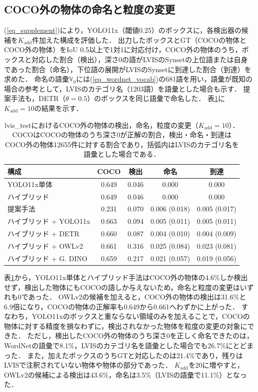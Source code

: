 \subsection{COCO外の物体の命名と粒度の変更}
(\ref{eq_supplement})により，YOLO11x（閾値0.25）のボックスに，各検出器の候補を$ K_{\mathrm{add}} $件加えた構成を評価した．
出力したボックスとGT（COCOの物体とCOCO外の物体）をIoU 0.5以上で1対1に対応付け，COCO外の物体のうち，ボックスと対応した割合（検出），深さ0の語がLVISのSynsetの上位語または自身であった割合（命名），下位語の展開がLVISのSynsetに到達した割合（到達）を求めた．
命名の語彙$ {\mathbb V}_0 $には(\ref{eq_wordnet_vocab})の681語を用い，語彙が既知の場合の参考として，LVISのカテゴリ名（1203語）を語彙とした場合も示す．
提案手法も，DETR（$ \theta = 0.5 $）のボックスを同じ語彙で命名した．
表\ref{tab_open}に$ K_{\mathrm{add}} = 10 $の結果を示す．

\begin{table}[t]
    \vspace{3mm}
    \centering
    \caption{lvis\_testにおけるCOCO外の物体の検出，命名，粒度の変更（$ K_{\mathrm{add}} = 10 $）．COCOはCOCOの物体のうち深さ0が正解の割合，検出・命名・到達はCOCO外の物体12655件に対する割合であり，括弧内はLVISのカテゴリ名を語彙とした場合である．}
    \label{tab_open}
    \scriptsize
    \setlength{\tabcolsep}{1.5pt}
    \begin{tabular}{lcccc}
        \toprule
        構成 & COCO & 検出 & 命名 & 到達 \\
        \midrule
        YOLO11x単体          & 0.649 & 0.046 & 0.000 & 0.000 \\
        ハイブリッド         & 0.649 & 0.046 & 0.000 & 0.000 \\
        提案手法             & 0.231 & 0.070 & 0.006 (0.018) & 0.005 (0.017) \\
        ハイブリッド + YOLO11x & 0.663 & 0.094 & 0.005 (0.011) & 0.005 (0.011) \\
        ハイブリッド + DETR    & 0.660 & 0.087 & 0.004 (0.010) & 0.004 (0.009) \\
        ハイブリッド + OWLv2   & 0.661 & 0.316 & 0.025 (0.084) & 0.023 (0.081) \\
        ハイブリッド + G. DINO & 0.659 & 0.217 & 0.021 (0.057) & 0.019 (0.056) \\
        \bottomrule
    \end{tabular}
\end{table}

表\ref{tab_open}から，YOLO11x単体とハイブリッド手法はCOCO外の物体の4.6\%しか検出せず，検出した物体にもCOCOの語しか与えないため，命名と粒度の変更はいずれも0であった．
OWLv2の候補を加えると，COCO外の物体の検出は31.6\%と6.9倍になり，COCOの物体の正解率も0.649から0.661へわずかに上がった．
すなわち，YOLO11xのボックスと重ならない領域のみを加えることで，COCOの物体に対する精度を損なわずに，検出されなかった物体を粒度の変更の対象にできた．
ただし，検出したCOCO外の物体のうち深さ0を正しく命名できたのは，WordNetの語彙で8.1\%，LVISのカテゴリ名を語彙とした場合でも26.7\%にとどまった．
また，加えたボックスのうちGTと対応したのは21.4\%であり，残りはLVISで注釈されていない物体や物体の部分であった．
$ K_{\mathrm{add}} $を20に増やすと，OWLv2の候補による検出は43.6\%，命名は3.5\%（LVISの語彙で11.1\%）となった．

